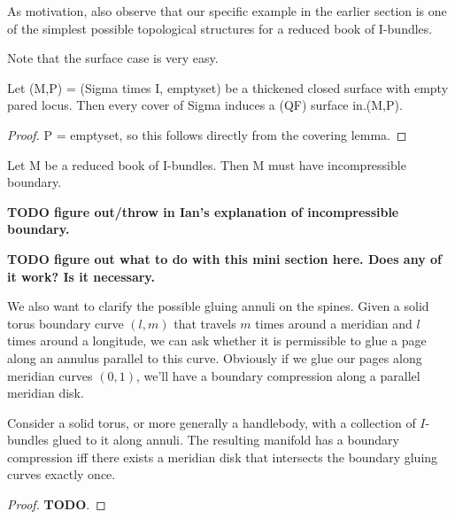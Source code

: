 As motivation, also observe that our specific example in the earlier section is
one of the simplest possible topological structures for a reduced book of
I-bundles.

Note that the surface case is very easy.

\begin{prop}

Let (M,P) = (Sigma times I, emptyset) be a thickened closed surface with empty
pared locus. Then every cover of Sigma induces a (QF) surface in.(M,P).

\end{prop}

\begin{proof}

P = emptyset, so this follows directly from the covering lemma.

\end{proof}

\begin{prop}

Let M be a reduced book of I-bundles. Then M must have incompressible boundary.


\end{prop}

\textbf{TODO figure out/throw in Ian's explanation of incompressible boundary.}

{\tiny

\textbf{TODO figure out what to do with this mini section here. Does any of it
work? Is it necessary.}

We also want to clarify the possible gluing annuli on the spines. Given a solid
torus boundary curve $(l,m)$ that travels $m$ times around a meridian and $l$
times around a longitude, we can ask whether it is permissible to glue a page
along an annulus parallel to this curve. Obviously if we glue our pages along
meridian curves $(0,1)$, we'll have a boundary compression along a parallel
meridian disk.


\begin{lemma}

Consider a solid torus, or more generally a handlebody, with a collection of
$I$-bundles glued to it along annuli. The resulting manifold has a boundary
compression iff there exists a meridian disk that intersects the boundary
gluing curves exactly once.

\end{lemma}

\begin{proof}

\textbf{TODO}.

\end{proof}

}
